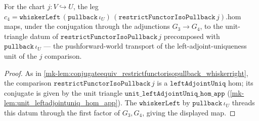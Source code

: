 \begin{lemma}\label{mk-lem:conjugateequiv_restrictfunctorisopullback_whiskerleft}
  \leanok

  For the chart \(j : V \hookrightarrow U\), the leg
  \(c_4 = \mathtt{whiskerLeft}\,(\mathtt{pullback}\,\iota_U)\,(\mathtt{restrictFunctorIsoPullback}\,j).\mathrm{hom}\)
  maps, under the conjugation through the adjunctions \(G_3 \to G_4\), to the unit-triangle datum of
  \(\mathtt{restrictFunctorIsoPullback}\,j\) precomposed with \(\mathtt{pullback}\,\iota_U\) --- the
  pushforward-world transport of the left-adjoint-uniqueness unit of the \(j\) comparison.
\end{lemma}
\begin{proof}
  \leanok
  As in \ref{mk-lem:conjugateequiv_restrictfunctorisopullback_whiskerright}, the comparison
  \(\mathtt{restrictFunctorIsoPullback}\,j\) is a \(\mathtt{leftAdjointUniq}\) hom; its conjugate is
  given by the unit triangle \(\mathtt{unit\_leftAdjointUniq\_hom\_app}\)
  (\ref{mk-lem:unit_leftadjointuniq_hom_app}). The \(\mathtt{whiskerLeft}\) by \(\mathtt{pullback}\,\iota_U\)
  threads this datum through the first factor of \(G_3, G_4\), giving the displayed map.
\end{proof}

